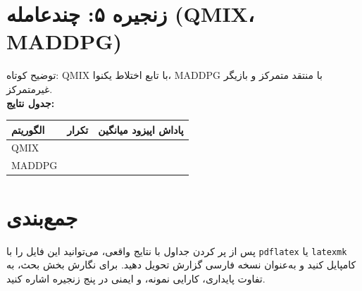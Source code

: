 \documentclass[12pt]{article}
\begin{document}
\section{زنجیره ۵: چندعامله (QMIX، MADDPG)}
توضیح کوتاه: QMIX با تابع اختلاط یکنوا، MADDPG با منتقد متمرکز و بازیگر غیرمتمرکز.\\
\textbf{جدول نتایج:}
\begin{table}[h]
    \centering
    \begin{tabular}{lcc}
    \toprule
    الگوریتم & تکرار & پاداش اپیزود میانگین \\
    \midrule
    QMIX & & \\
    MADDPG & & \\
    \bottomrule
    \end{tabular}
\end{table}

\section{جمع‌بندی}
پس از پر کردن جداول با نتایج واقعی، می‌توانید این فایل را با \texttt{pdflatex} یا \texttt{latexmk} کامپایل کنید و به‌عنوان نسخه فارسی گزارش تحویل دهید. برای نگارش بخش بحث، به تفاوت پایداری، کارایی نمونه، و ایمنی در پنج زنجیره اشاره کنید.
\end{document}
